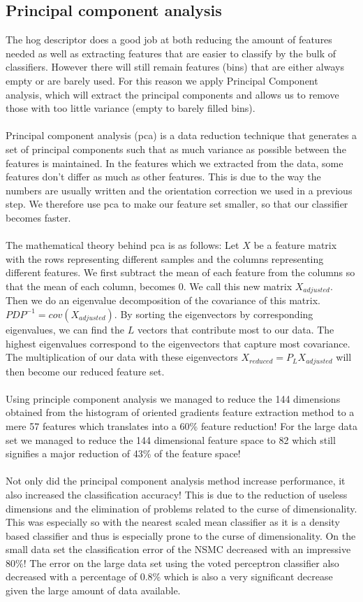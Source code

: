 \documentclass[%
        compressed,
        final,
        notitlepage,
        narroweqnarray,
        inline,
        twoside,
        ]{ieee}
\begin{document}
\subsection{Principal component analysis}
The hog descriptor does a good job at both reducing the amount of features needed as well as extracting features that are easier to classify by the bulk of classifiers. However there will still remain features (bins) that are either always empty or are barely used. For this reason we apply Principal Component analysis, which will extract the principal components and allows us to remove those with too little variance (empty to barely filled bins).\\\\
Principal component analysis (pca) is a data reduction technique that generates a set of
principal components such that as much variance as possible between the features is maintained.  In the features which we extracted from the data, some features don't differ as much as other features. This is due to the way the numbers are usually written and the orientation correction we used in a previous step. We therefore use pca to make our feature set smaller, so that our classifier becomes faster.\\\\
The mathematical theory behind pca is as follows:
Let $X$ be a feature matrix with the rows representing different samples and the
columns representing different features.  We first subtract the mean of each
feature from the columns so that the mean of each column, becomes 0. We call
this new matrix $X_{adjusted}$. Then we do an eigenvalue decomposition of the
covariance of this matrix. $PDP^{-1}=cov(X_{adjusted})$. By sorting the
eigenvectors by corresponding eigenvalues, we can find the $L$ vectors that
contribute most to our data.  The highest eigenvalues correspond to the
eigenvectors that capture most covariance. The multiplication of our data with
these eigenvectors $X_{reduced}=P_L X_{adjusted}$ will then become our reduced feature set.\cite{Pearson}\\\\
Using principle component analysis we managed to reduce the 144 dimensions obtained from the histogram of oriented gradients feature extraction method to a mere 57 features which translates into a 60\% feature reduction! For the large data set we managed to reduce the 144 dimensional feature space to 82 which still signifies a major reduction of 43\% of the feature space! \\\\
Not only did the principal component analysis method increase performance, it also increased the classification accuracy! This is due to the reduction of useless dimensions and the elimination of problems related to the curse of dimensionality. This was especially so with the nearest scaled mean classifier as it is a density based classifier and thus is especially prone to the curse of dimensionality. On the small data set the classification error of the NSMC decreased with an impressive 80\%! The error on the large data set using the voted perceptron classifier also decreased with a percentage of 0.8\% which is also a very significant decrease given the large amount of data available.
\end{document}
